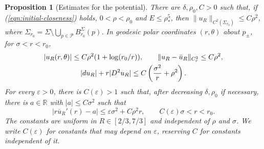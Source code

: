 \documentclass[11pt,a4paper]{article}
\numberwithin{equation}{section}
\newtheorem{proposition}[theorem]{Proposition}
\theoremstyle{definition}
\theoremstyle{remark}
\newcommand{\R}{\mathbb R}
\begin{document}
	\begin{proposition}[Estimates for the potential]\label{prop:exterior-scalar}
		There are $\delta,\rho_0,C>0$ such that, if
		(\ref{eqn:initial-closeness}) holds, $0<\rho<\rho_0$ and $E\le\rho_*^5$, then
		$\|u_R\|_{C^2(\Sigma_{r_0})}\le C\rho^2$, where
		$\Sigma_{r_0}=\Sigma\setminus\bigcup_{p\in\mathcal P}B_{r_0}^{\Sigma}(p)$.
		In geodesic polar coordinates $(r,\theta)$ about $p_\pm$, for
		$\sigma<r<r_0$,
		\begin{gather}
			|u_R(r,\theta)|\le C\rho^2(1+\log(r_0/r)),\qquad
			\|u_R-\bar u_R\|_{C^2_r}\le C\rho^2,\notag\\
			|du_R|+r|D^2u_R|
			\le C\left(\frac{\sigma^2}{r}+\rho^2\right).
			\label{eqn:potential-estimates}
		\end{gather}
		For every $\varepsilon>0$, there is $C(\varepsilon)>1$ such that,
		after decreasing $\delta,\rho_0$ if necessary, there is $a\in\R$ with
		$|a|\le C\sigma^2$ such that
		\begin{equation}\label{eqn:neck-coefficient}
			|r\bar u_R'(r)-a|
			\le\varepsilon\sigma^2+C\rho^2r,
			\qquad C(\varepsilon)\sigma<r<r_0.
		\end{equation}
		The constants are uniform in $R\in[2/3,7/3]$ and independent of
		$\rho$ and $\sigma$. We write $C(\varepsilon)$ for constants that may
		depend on $\varepsilon$, reserving $C$ for constants independent of it.
	\end{proposition}
	
\end{document}
